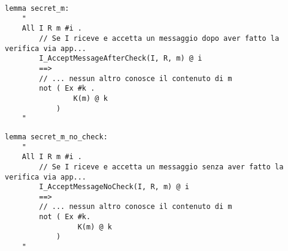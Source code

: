\begin{lstlisting}[caption={Se entrambi gli utenti hanno confermato tramite l'applicazione di 
    vedere la stessa chiave, l'avversario non è in grado di decifrare messaggi.},
    label=cod:lemma:secret_m]
lemma secret_m:
    "
    All I R m #i .
        // Se I riceve e accetta un messaggio dopo aver fatto la verifica via app...
        I_AcceptMessageAfterCheck(I, R, m) @ i
        ==>
        // ... nessun altro conosce il contenuto di m
        not ( Ex #k . 
                K(m) @ k 
            )
    "
\end{lstlisting}

\begin{lstlisting}[caption={Se gli utenti non hanno confermato tramite l'applicazione di 
    vedere la stessa chiave, un attaccante potrebbe aver impersonato uno degli agenti. Questo lemma è falso.},
    label=cod:lemma:secret_m_no_check]
lemma secret_m_no_check:
    "
    All I R m #i .
        // Se I riceve e accetta un messaggio senza aver fatto la verifica via app...
        I_AcceptMessageNoCheck(I, R, m) @ i
        ==>
        // ... nessun altro conosce il contenuto di m
        not ( Ex #k.
                 K(m) @ k 
            )
    "
\end{lstlisting}
